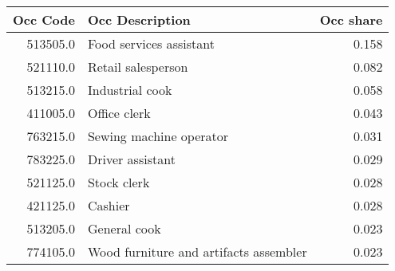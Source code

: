\begin{table}
\centering
\label{table:shock_case_study_AccomFood_gamma_47_occ_counts}
\begin{tabular}{rlr}
\toprule
Occ Code &                        Occ Description & Occ share \\
\midrule
513505.0 &                Food services assistant &     0.158 \\
521110.0 &                     Retail salesperson &     0.082 \\
513215.0 &                        Industrial cook &     0.058 \\
411005.0 &                           Office clerk &     0.043 \\
763215.0 &                Sewing machine operator &     0.031 \\
783225.0 &                       Driver assistant &     0.029 \\
521125.0 &                            Stock clerk &     0.028 \\
421125.0 &                                Cashier &     0.028 \\
513205.0 &                           General cook &     0.023 \\
774105.0 & Wood furniture and artifacts assembler &     0.023 \\
\bottomrule
\end{tabular}
\end{table}
